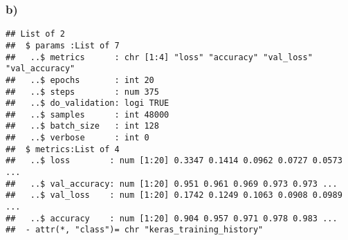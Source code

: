 \documentclass[]{article}
\newenvironment{Shaded}{\begin{snugshade}}{\end{snugshade}}
\newcommand{\DataTypeTok}[1]{\textcolor[rgb]{0.13,0.29,0.53}{#1}}
\newcommand{\DecValTok}[1]{\textcolor[rgb]{0.00,0.00,0.81}{#1}}
\newcommand{\FloatTok}[1]{\textcolor[rgb]{0.00,0.00,0.81}{#1}}
\newcommand{\KeywordTok}[1]{\textcolor[rgb]{0.13,0.29,0.53}{\textbf{#1}}}
\newcommand{\NormalTok}[1]{#1}
\newcommand{\OperatorTok}[1]{\textcolor[rgb]{0.81,0.36,0.00}{\textbf{#1}}}
\newcommand{\StringTok}[1]{\textcolor[rgb]{0.31,0.60,0.02}{#1}}
\begin{document}
\hypertarget{b-3}{%
\subsubsection{b)}\label{b-3}}

\begin{Shaded}
\end{Shaded}

\begin{verbatim}
## List of 2
##  $ params :List of 7
##   ..$ metrics      : chr [1:4] "loss" "accuracy" "val_loss" "val_accuracy"
##   ..$ epochs       : int 20
##   ..$ steps        : num 375
##   ..$ do_validation: logi TRUE
##   ..$ samples      : int 48000
##   ..$ batch_size   : int 128
##   ..$ verbose      : int 0
##  $ metrics:List of 4
##   ..$ loss        : num [1:20] 0.3347 0.1414 0.0962 0.0727 0.0573 ...
##   ..$ val_accuracy: num [1:20] 0.951 0.961 0.969 0.973 0.973 ...
##   ..$ val_loss    : num [1:20] 0.1742 0.1249 0.1063 0.0908 0.0989 ...
##   ..$ accuracy    : num [1:20] 0.904 0.957 0.971 0.978 0.983 ...
##  - attr(*, "class")= chr "keras_training_history"
\end{verbatim}
\end{document}
